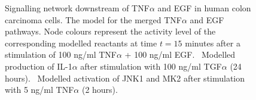 \begin{figure}[!htpb]
\caption{Signalling network downstream of TNF$\alpha$ and EGF in human colon carcinoma cells.
{\bf \protect{}}
The model for the merged TNF$\alpha$ and EGF pathways. Node colours represent the
activity level of the corresponding modelled reactants at time $t = 15$ minutes after
a stimulation of 100 ng/ml TNF$\alpha$ + 100 ng/ml EGF.
{\bf \protect{}}~Modelled production of IL-1$\alpha$ after stimulation with 100 ng/ml TGF$\alpha$ (24 hours).
{\bf \protect{}}~Modelled activation of JNK1 and MK2 after stimulation with 5 ng/ml TNF$\alpha$ (2 hours).
}\label{fig:large-model-all}
\end{figure}


